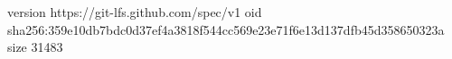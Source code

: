 version https://git-lfs.github.com/spec/v1
oid sha256:359e10db7bdc0d37ef4a3818f544cc569e23e71f6e13d137dfb45d358650323a
size 31483
